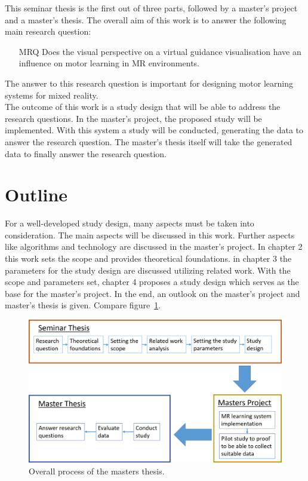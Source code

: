 This seminar thesis is the first out of three parts, followed by a master's project and a master's thesis. The overall aim of this work is to answer the following main research question:
\begin{itemize}
	\item[MRQ] Does the visual perspective on a virtual guidance visualisation have an influence on motor learning in MR environments.
\end{itemize}
The answer to this research question is important for designing motor learning systems for mixed reality.\\
The outcome of this work is a study design that will be able to address the research questions. In the master's project, the proposed study will be implemented. With this system a study will be conducted, generating the data to answer the research question. The master's thesis itself will take the generated data to finally answer the research question.


\section{Outline}
For a well-developed study design, many aspects must be taken into consideration. The main aspects will be discussed in this work. Further aspects like algorithms and technology are discussed in the master's project. In chapter 2 this work sets the scope and provides theoretical foundations. in chapter 3 the parameters for the study design are discussed utilizing related work. With the scope and parameters set, chapter 4 proposes a study design which serves as the base for the master's project. In the end, an outlook on the master's project and master's thesis is given. Compare figure~\ref{fig:overallProcess}.
\begin{figure}[h]
	\centering
	\includegraphics[width=1.0\textwidth]{img/overallProcess_new.png}
	\caption{Overall process of the masters thesis.}
	\label{fig:overallProcess}
\end{figure}\\


